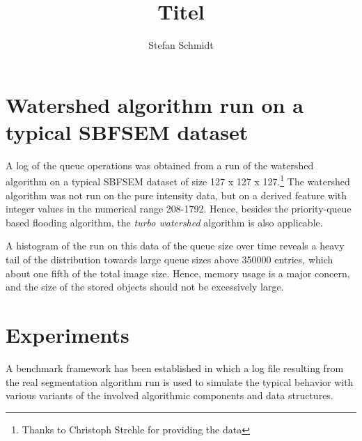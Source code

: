 \documentclass[a4paper,11pt,german]{article}
\title{Titel}
\author{Stefan Schmidt}
\theoremstyle{plain}
\theoremstyle{definition}
\theoremstyle{remark}
\begin{document}
% 

\renewcommand\cite[1]{\citep{#1}}




\maketitle

\section{Watershed algorithm run on a typical SBFSEM dataset}

A log of the queue operations was obtained from a run of the watershed
algorithm on a typical SBFSEM dataset of size 127 x 127 x
127.\footnote{Thanks to Christoph Strehle for providing the
  data} %
The watershed algorithm was not run on the pure intensity data, but on
a derived feature with integer values in the numerical range
208-1792. %
Hence, besides the priority-queue based flooding algorithm, the
\emph{turbo watershed} algorithm is also applicable. %

A histogram of the run on this data
of the queue size over time
reveals a heavy tail of the distribution towards large queue sizes
above 350000 entries, which about one fifth of the total image size. %
Hence, memory usage is a major concern, and the size of the stored
objects should not be excessively large.



\section{Experiments}
\label{sec:experiments}

A benchmark framework has been established in which a log file
resulting from the real segmentation algorithm run is used to simulate
the typical behavior with various variants of the involved algorithmic
components and data structures. 
\end{document}

